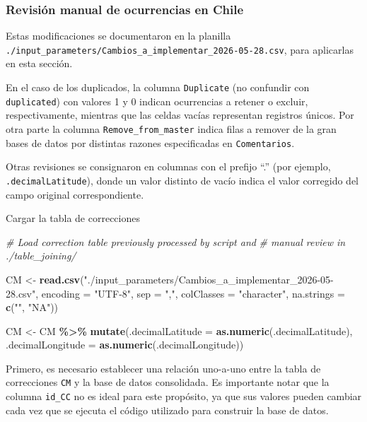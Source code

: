 \documentclass[sn-apa,pdflatex]{sn-jnl}
\newenvironment{Shaded}{\begin{snugshade}}{\end{snugshade}}
\newcommand{\AttributeTok}[1]{\textcolor[rgb]{0.13,0.29,0.53}{#1}}
\newcommand{\CommentTok}[1]{\textcolor[rgb]{0.56,0.35,0.01}{\textit{#1}}}
\newcommand{\FunctionTok}[1]{\textcolor[rgb]{0.13,0.29,0.53}{\textbf{#1}}}
\newcommand{\NormalTok}[1]{#1}
\newcommand{\OtherTok}[1]{\textcolor[rgb]{0.56,0.35,0.01}{#1}}
\newcommand{\SpecialCharTok}[1]{\textcolor[rgb]{0.81,0.36,0.00}{\textbf{#1}}}
\newcommand{\StringTok}[1]{\textcolor[rgb]{0.31,0.60,0.02}{#1}}
\begin{document}
\subsubsection{Revisión manual de ocurrencias en
Chile}\label{revisiuxf3n-manual-de-ocurrencias-en-chile}

Estas modificaciones se documentaron en la planilla
\texttt{./input\_parameters/Cambios\_a\_implementar\_2026-05-28.csv},
para aplicarlas en esta sección.

En el caso de los duplicados, la columna \texttt{Duplicate} (no
confundir con \texttt{duplicated}) con valores 1 y 0 indican ocurrencias
a retener o excluir, respectivamente, mientras que las celdas vacías
representan registros únicos. Por otra parte la columna
\texttt{Remove\_from\_master} indica filas a remover de la gran bases de
datos por distintas razones especificadas en \texttt{Comentarios}.

Otras revisiones se consignaron en columnas con el prefijo ``.'' (por
ejemplo, \texttt{.decimalLatitude}), donde un valor distinto de vacío
indica el valor corregido del campo original correspondiente.

Cargar la tabla de correcciones

\begin{Shaded}
\begin{Highlighting}[]
\CommentTok{\# Load correction table previously processed by script and}
\CommentTok{\# manual review in ./table\_joining/}

\NormalTok{CM }\OtherTok{\textless{}{-}} \FunctionTok{read.csv}\NormalTok{(}\StringTok{"./input\_parameters/Cambios\_a\_implementar\_2026{-}05{-}28.csv"}\NormalTok{,}
    \AttributeTok{encoding =} \StringTok{"UTF{-}8"}\NormalTok{, }\AttributeTok{sep =} \StringTok{","}\NormalTok{, }\AttributeTok{colClasses =} \StringTok{"character"}\NormalTok{,}
    \AttributeTok{na.strings =} \FunctionTok{c}\NormalTok{(}\StringTok{""}\NormalTok{, }\StringTok{"NA"}\NormalTok{))}

\NormalTok{CM }\OtherTok{\textless{}{-}}\NormalTok{ CM }\SpecialCharTok{\%\textgreater{}\%}
    \FunctionTok{mutate}\NormalTok{(}\AttributeTok{.decimalLatitude =} \FunctionTok{as.numeric}\NormalTok{(.decimalLatitude), }\AttributeTok{.decimalLongitude =} \FunctionTok{as.numeric}\NormalTok{(.decimalLongitude))}
\end{Highlighting}
\end{Shaded}

Primero, es necesario establecer una relación uno-a-uno entre la tabla
de correcciones \texttt{CM} y la base de datos consolidada. Es
importante notar que la columna \texttt{id\_CC} no es ideal para este
propósito, ya que sus valores pueden cambiar cada vez que se ejecuta el
código utilizado para construir la base de datos.
\end{document}
